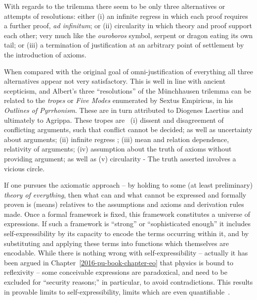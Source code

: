 With regards to the {trilemma} there seem to be only three alternatives or attempts of resolutions:  either
(i) an infinite regress in which each proof requires a further proof, {\it ad infinitum}; or
(ii) circularity in which theory and proof support each other; very much like the {\em ouroboros} symbol,
 serpent or dragon eating its own tail; or
(iii) a termination of justification at an arbitrary point of settlement by the introduction of axioms.

When compared with the original goal of omni-justification of everything all three alternatives  appear not very satisfactory.
This is well in line with ancient scepticism, and Albert's three ``resolutions'' of the M\"unchhausen trilemma
can be related to the {\em tropes}
or {\em Five Modes}
enumerated by Sextus Empiricus, in his {\em Outlines of Pyrrhonism}.
These are in turn attributed to Diogenes Laertius and ultimately to Agrippa.
These tropes are~\cite{sep-skepticism-ancient}
(i) dissent and  disagreement of conflicting arguments, such that conflict cannot be decided;  as well as uncertainty about arguments;
(ii) infinite regress ;
(iii) mean and relation dependence, relativity of arguments;
(iv) assumption about the truth of axioms without providing argument; as well as
(v) circularity - The truth asserted involves a vicious circle.



If one pursues the axiomatic approach --
by holding to some (at least preliminary)
{\em theory of everything},
then what can and what cannot be expressed and formally proven is (means) relatives to the assumptions and axioms and derivation rules made.
Once a formal framework is fixed, this framework constitutes a universe of expressions.
If such a framework is ``strong'' or ``sophisticated enough'' it includes self-expressibility by its capacity to encode the terms occurring within it,
and by substituting and applying these terms into functions which themselves are encodable.
While there is nothing wrong with self-expressibility
-- actually it has been argued in Chapter~\ref{2016-pu-book-chapter-eo} that physics is bound to reflexivity --
some conceivable expressions are paradoxical, and need to be excluded for ``security reasons;'' in particular,
to avoid contradictions.
This results in provable limits to self-expressibility,
limits which are even quantifiable~\cite{chaitin-ACM,Chaitin199283}.

